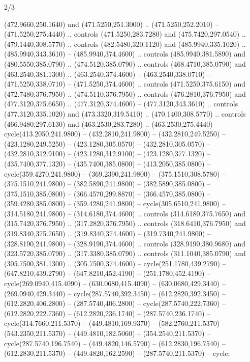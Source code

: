 \begin{flagdescription}{2/3}
\begin{scope}[xshift=0.5\flaglength,yshift=0.5\flagwidth,scale=\flagwidth/480]
\begin{scope}[y=0.80pt, x=0.80pt, yscale=-1,shift={(-450,-300)}]
  (472.9660,250.1640) and (471.5250,251.3000) .. (471.5250,252.2010) --
  (471.5250,275.4440) .. controls (471.5250,283.7280) and (475.7420,297.0540) ..
  (479.1440,308.5770) .. controls (482.5480,320.1120) and (485.9940,335.1020) ..
  (485.9940,343.3610) -- (485.9940,374.4600) .. controls (485.9940,381.5890) and
  (480.5550,385.0790) .. (474.5120,385.0790) .. controls (468.4710,385.0790) and
  (463.2540,381.1300) .. (463.2540,374.4600) -- (463.2540,338.0710) --
  (471.5250,338.0710) -- (471.5250,374.4600) .. controls (471.5250,375.6150) and
  (472.7480,376.7950) .. (474.5110,376.7950) .. controls (476.2810,376.7950) and
  (477.3120,375.6650) .. (477.3120,374.4600) -- (477.3120,343.3610) .. controls
  (477.3120,335.1020) and (473.3320,319.5410) .. (470.1400,308.5770) .. controls
  (466.9480,297.6130) and (463.2530,283.7280) .. (463.2530,275.4440) --
  cycle(413.2050,241.9800) -- (432.2810,241.9800) -- (432.2810,249.5250) --
  (423.1280,249.5250) -- (423.1280,305.0570) -- (432.2810,305.0570) --
  (432.2810,312.9100) -- (423.1280,312.9100) -- (423.1280,377.1320) --
  (435.7400,377.1320) -- (435.7400,385.0800) -- (413.2050,385.0800) --
  cycle(359.4270,241.9800) -- (369.2390,241.9800) -- (375.1510,308.5780) --
  (375.1510,241.9800) -- (382.5890,241.9800) -- (382.5890,385.0800) --
  (375.1510,385.0800) -- (366.4570,299.8870) -- (366.4570,385.0800) --
  (359.4280,385.0800) -- (359.4280,241.9800) -- cycle(305.6510,241.9800) --
  (314.5180,241.9800) -- (314.6180,374.4600) .. controls (314.6180,375.7650) and
  (315.7420,376.7950) .. (317.2820,376.7950) .. controls (318.6410,376.7950) and
  (319.8340,375.7650) .. (319.8340,374.4600) -- (319.7340,241.9800) --
  (328.8190,241.9800) -- (328.9190,374.4600) .. controls (328.9190,380.9680) and
  (323.5720,385.0790) .. (317.3380,385.0790) .. controls (311.1040,385.0790) and
  (305.7500,381.1300) .. (305.7500,374.4600) -- cycle(251.1780,439.2790) --
  (647.8210,439.2790) -- (647.8210,452.4190) -- (251.1780,452.4190) --
  cycle(269.0940,415.4090) -- (630.0680,415.4090) -- (630.0680,429.3440) --
  (269.0940,429.3440) -- cycle(287.5740,392.3450) -- (612.2820,392.3450) --
  (612.2820,406.2800) -- (287.5740,406.2800) -- cycle(287.5740,222.7360) --
  (612.2820,222.7360) -- (612.2820,236.1740) -- (287.5740,236.1740) --
  cycle(314.7660,211.5370) -- (449.4810,169.9370) -- (582.2760,211.5370) --
  (543.2350,211.5370) -- (449.4810,182.5060) -- (354.2540,211.5370) --
  cycle(287.5740,196.7540) -- (449.4820,146.5790) -- (612.2830,196.7540) --
  (612.2830,211.5370) -- (449.4820,162.2590) -- (287.5740,211.5370) -- cycle;
\end{scope}
\end{scope}
\framecode{}
\end{flagdescription}
